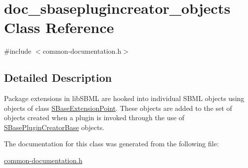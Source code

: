 \hypertarget{classdoc__sbaseplugincreator__objects}{}\section{doc\+\_\+sbaseplugincreator\+\_\+objects Class Reference}
\label{classdoc__sbaseplugincreator__objects}


{\ttfamily \#include $<$common-\/documentation.\+h$>$}



\subsection{Detailed Description}
\begin{DoxyParagraph}{}
Package extensions in lib\+S\+B\+ML are hooked into individual S\+B\+ML objects using objects of class \hyperlink{class_s_base_extension_point}{S\+Base\+Extension\+Point}. These objects are added to the set of objects created when a plugin is invoked through the use of \hyperlink{class_s_base_plugin_creator_base}{S\+Base\+Plugin\+Creator\+Base} objects. 
\end{DoxyParagraph}


The documentation for this class was generated from the following file\+:\begin{DoxyCompactItemize}
\item 
\hyperlink{common-documentation_8h}{common-\/documentation.\+h}\end{DoxyCompactItemize}
